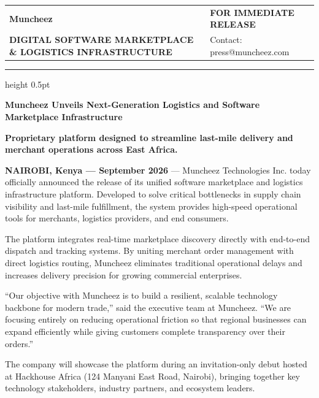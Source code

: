\documentclass[11pt,a4paper]{article}
\begin{document}
\begin{tabularx}{\textwidth}{@{} X >{\raggedleft\arraybackslash}X @{}}
    {\fontsize{28}{34}\sffamily\bfseries\color{SolidBlack} Muncheez\color{LinkBlue}{\textbf{.}}} & \textsf{\small\bfseries\color{SolidBlack} FOR IMMEDIATE RELEASE} \\
    {\textsf{\scriptsize\bfseries\color{SolidBlack} DIGITAL SOFTWARE MARKETPLACE \& LOGISTICS INFRASTRUCTURE}} & \textsf{\small\color{SolidBlack} Contact: press@muncheez.com} \\
\end{tabularx}

\vspace{0.4cm}
\hrule height 0.5pt
\vspace{0.8cm}

{\fontsize{18}{22}\sffamily\bfseries\color{SolidBlack} Muncheez Unveils Next-Generation Logistics and Software Marketplace Infrastructure}

\vspace{0.1cm}
{\fontsize{11}{15}\sffamily\bfseries\color{LinkBlue} Proprietary platform designed to streamline last-mile delivery and merchant operations across East Africa.}

\vspace{0.6cm}

\textbf{NAIROBI, Kenya — September 2026} — Muncheez Technologies Inc. today officially announced the release of its unified software marketplace and logistics infrastructure platform. Developed to solve critical bottlenecks in supply chain visibility and last-mile fulfillment, the system provides high-speed operational tools for merchants, logistics providers, and end consumers.

The platform integrates real-time marketplace discovery directly with end-to-end dispatch and tracking systems. By uniting merchant order management with direct logistics routing, Muncheez eliminates traditional operational delays and increases delivery precision for growing commercial enterprises.

``Our objective with Muncheez is to build a resilient, scalable technology backbone for modern trade,'' said the executive team at Muncheez. ``We are focusing entirely on reducing operational friction so that regional businesses can expand efficiently while giving customers complete transparency over their orders.''

The company will showcase the platform during an invitation-only debut hosted at Hackhouse Africa (124 Manyani East Road, Nairobi), bringing together key technology stakeholders, industry partners, and ecosystem leaders.
\end{document}
